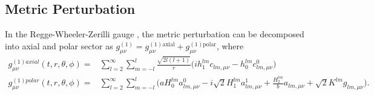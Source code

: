 \documentclass[11pt]{article}
\begin{document}
\subsection{Metric Perturbation}
In the Regge-Wheeler-Zerilli gauge  \cite{PhysRevLett.24.737, PhysRevD.2.2141}, the metric perturbation can be decomposed into axial and polar sector as $g_{\mu\nu}^{(1)} = g_{\mu\nu}^{(1) \textrm{axial}}+g_{\mu\nu}^{(1) \textrm{polar}}$, where 
\begin{equation} \label{prt1}
    \begin{aligned}
    g_{\mu\nu}^{(1)axial}(t,r,\theta,\phi) =& \sum_{l=2}^{\infty}\sum_{m=-l}^{l} \frac{\sqrt{2l(l+1)}}{r}\Big(ih_{1}^{lm}c_{lm,\mu\nu}-h_{0}^{lm}c^{0}_{lm, \mu\nu}\Big)  \\
    g_{\mu\nu}^{(1)polar}(t,r,\theta,\phi) =& \sum_{l=2}^{\infty}\sum_{m=-l}^{l}\Big(aH_{0}^{lm}a^{0}_{lm,\mu\nu}-i\sqrt{2}H_{1}^{lm}a^{1}_{lm,\mu\nu}+\frac{H_{2}^{lm}}{b}a_{lm,\mu\nu}+\sqrt{2}K^{lm}g_{lm,\mu\nu}\Big).
\end{aligned}
\end{equation}
\end{document}
